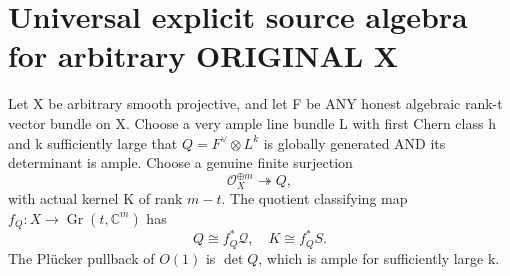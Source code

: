 \documentclass[11pt]{article}
\begin{document}
\section{Universal explicit source algebra for arbitrary ORIGINAL X}
Let X be arbitrary smooth
projective, and let F be
ANY honest algebraic
rank-t vector bundle on X.
Choose a very ample
line bundle L with first
Chern class h and
k sufficiently large that
$Q=F^\vee\otimes L^k$
is globally generated AND
its determinant is ample.
Choose a genuine finite
surjection
\[
 \mathcal O_X^{\oplus m}
      \twoheadrightarrow Q,
\]
with actual kernel K of
rank $m-t$. The quotient
classifying map
$f_Q:X\to\operatorname{Gr}
(t,\mathbb C^m)$ has
\[
  Q\cong f_Q^*\mathcal Q,
 \quad K\cong f_Q^*S.
\]
The Pl\"ucker pullback
of $O(1)$ is
$\det Q$, which is ample
for sufficiently large k.
\end{document}
